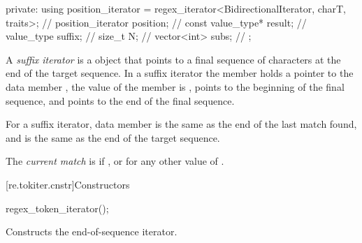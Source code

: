 \begin{codeblock}
{{  private:
    using position_iterator =
      regex_iterator<BidirectionalIterator, charT, traits>;     // \expos
    position_iterator position;                                 // \expos
    const value_type* result;                                   // \expos
    value_type suffix;                                          // \expos
    size_t N;                                                   // \expos
    vector<int> subs;                                           // \expos
  };
}
\end{codeblock}

\pnum
A \textit{suffix iterator} is a  object
that points to a final sequence of characters at
the end of the target sequence. In a suffix iterator the
member  holds a pointer to the data
member , the value of the member 
is ,  points to the beginning of the
final sequence, and  points to the end of the
final sequence.

\pnum
\begin{note}
For a suffix iterator, data
member  is the same as the end of the last match
found, and  is the same as the end of the target
sequence.
\end{note}

\pnum
The \textit{current match} is  if , or
 for any other value of .

[re.tokiter.cnstr]{Constructors}

%
\begin{itemdecl}
regex_token_iterator();
\end{itemdecl}

\begin{itemdescr}
\pnum
\effects
Constructs the end-of-sequence iterator.
\end{itemdescr}

